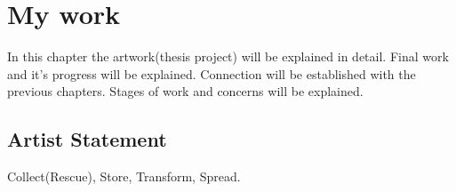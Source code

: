 % 






\chapter{My work}
In this chapter the artwork(thesis project) will be explained in detail. Final work and it's progress will be explained. Connection will be established with the previous chapters. Stages of work and concerns will be explained. 

\section{Artist Statement}
Collect(Rescue), Store, Transform, Spread.

